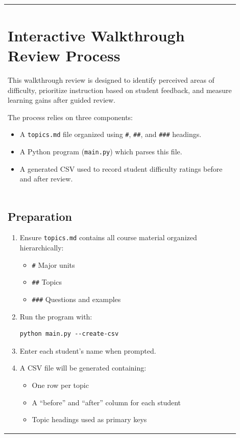 \documentclass{article}
\begin{document}
\begin{flushleft}
\begin{tabular}{|p{0.9\linewidth}|}
\section{Interactive Walkthrough Review Process}

This walkthrough review is designed to identify perceived areas of difficulty, prioritize instruction based on student feedback, and measure learning gains after guided review.

The process relies on three components:
\begin{itemize}
\item A \texttt{topics.md} file organized using \texttt{\#}, \texttt{\#\#}, and \texttt{\#\#\#} headings.
\item A Python program (\texttt{main.py}) which parses this file.
\item A generated CSV used to record student difficulty ratings before and after review.
\end{itemize} \\

\subsection{Preparation}

\begin{enumerate}
\item Ensure \texttt{topics.md} contains all course material organized hierarchically:
\begin{itemize}
\item \texttt{\#} Major units
\item \texttt{\#\#} Topics
\item \texttt{\#\#\#} Questions and examples
\end{itemize}

\item Run the program with:
\begin{verbatim}
python main.py --create-csv
\end{verbatim}

\item Enter each student's name when prompted.

\item A CSV file will be generated containing:
\begin{itemize}
\item One row per topic
\item A ``before'' and ``after'' column for each student
\item Topic headings used as primary keys
\end{itemize}


\end{enumerate}
\end{tabular}
\end{flushleft}
\end{document}
